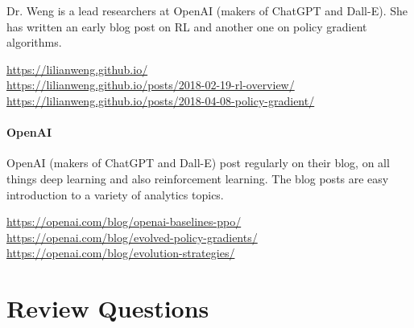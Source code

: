Dr. Weng is a lead researchers at OpenAI (makers of ChatGPT and Dall-E). She has written an early blog post on RL and another one on policy gradient algorithms. \\

\begin{resourcebox}
\footnotesize
\url{https://lilianweng.github.io/} \\

\url{https://lilianweng.github.io/posts/2018-02-19-rl-overview/}\\

\url{https://lilianweng.github.io/posts/2018-04-08-policy-gradient/}
\end{resourcebox}


\paragraph*{OpenAI}

OpenAI (makers of ChatGPT and Dall-E) post regularly on their blog, on all things deep learning and also reinforcement learning. The blog posts are easy introduction to a variety of analytics topics. \\

\begin{resourcebox}
\footnotesize
\url{https://openai.com/blog/openai-baselines-ppo/} \\

\url{https://openai.com/blog/evolved-policy-gradients/} \\

\url{https://openai.com/blog/evolution-strategies/}
\end{resourcebox}

\section{Review Questions}

